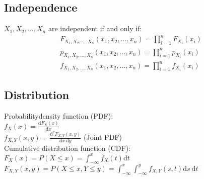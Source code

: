 \begin{mdframed}[style=eqbox]
  \subsection{Independence}
  $X_1, X_2, \ldots, X_n$ are independent if and only if:
  \vspace*{-6pt}
  \begin{align*}
    F_{X_1, X_2, \ldots, X_n}(x_1, x_2, \ldots, x_n) = \prod_{i=1}^{n} F_{X_i}(x_i)\\
    p_{X_1, X_2, \ldots, X_n}(x_1, x_2, \ldots, x_n) = \prod_{i=1}^{n} p_{X_i}(x_i)\\
    f_{X_1, X_2, \ldots, X_n}(x_1, x_2, \ldots, x_n) = \prod_{i=1}^{n} f_{X_i}(x_i)
  \end{align*}
\end{mdframed}

\begin{mdframed}[style=eqbox]
  \subsection{Distribution}
  Probabilitydensity function (PDF): \\
  $f_X(x) = \frac{\text{d} F_X(x)}{\text{d} x}$\\
  $f_{X,Y}(x,y) = \frac{\text{d}^2 F_{X,Y}(x,y)}{\text{d}x~\text{d}y}$ (Joint PDF)\\[0.5em]
  Cumulative distribution function (CDF): \\
  $F_X(x) = P({X \leq x}) = \int_{-\infty}^{x} f_X(t) \text{d} t$\\
  $F_{X,Y}(x,y) = P({X \leq x, Y \leq y}) = \int_{-\infty}^{x} \int_{-\infty}^{y} f_{X,Y}(s,t) \text{d}s~\text{d}t$
\end{mdframed}

